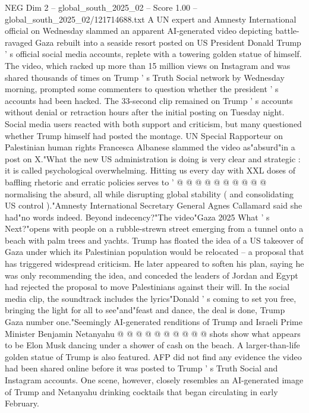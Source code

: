 \begin{textsample}{NEG Dim 2 – global\_south\_2025\_02 – Score 1.00 – global\_south\_2025\_02/121714688.txt}  \label{ex:f2_neg_069}
A UN expert and Amnesty International official on Wednesday slammed an apparent AI-generated video depicting battle-ravaged Gaza rebuilt into a seaside resort posted on US President Donald Trump ' s official social media accounts, replete with a towering golden statue of himself.
The video, which racked up more than 15 million views on Instagram and was shared thousands of times on Trump ' s Truth Social network by Wednesday morning, prompted some commenters to question whether the president ' s accounts had been hacked.
The 33-second clip remained on Trump ' s accounts without denial or retraction hours after the initial posting on Tuesday night.
Social media users reacted with both support and criticism, but many questioned whether Trump himself had posted the montage.
UN Special Rapporteur on Palestinian human rights Francesca Albanese slammed the video as"absurd"in a post on X."What the new US administration is doing is very clear and strategic : it is called psychological overwhelming.
Hitting us every day with XXL doses of baffling rhetoric and erratic policies serves to ' @ @ @ @ @ @ @ @ @ @ normalising the absurd, all while disrupting global stability ( and consolidating US control )."Amnesty International Secretary General Agnes Callamard said she had"no words indeed.
Beyond indecency?"The video"Gaza 2025 What ' s Next?"opens with people on a rubble-strewn street emerging from a tunnel onto a beach with palm trees and yachts.
Trump has floated the idea of a US takeover of Gaza under which its Palestinian population would be relocated -- a proposal that has triggered widespread criticism.
He later appeared to soften his plan, saying he was only recommending the idea, and conceded the leaders of Jordan and Egypt had rejected the proposal to move Palestinians against their will.
In the social media clip, the soundtrack includes the lyrics"Donald ' s coming to set you free, bringing the light for all to see"and"feast and dance, the deal is done, Trump Gaza number one."Seemingly AI-generated renditions of Trump and Israeli Prime Minister Benjamin Netanyahu @ @ @ @ @ @ @ @ @ @ shots show what appears to be Elon Musk dancing under a shower of cash on the beach.
A larger-than-life golden statue of Trump is also featured.
AFP did not find any evidence the video had been shared online before it was posted to Trump ' s Truth Social and Instagram accounts.
One scene, however, closely resembles an AI-generated image of Trump and Netanyahu drinking cocktails that began circulating in early February.

\end{textsample}
